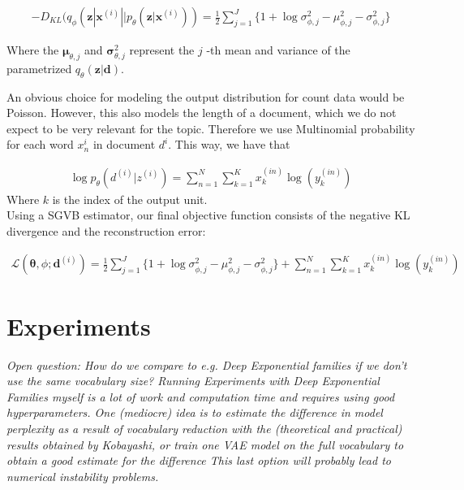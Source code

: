 \documentclass{report}
\begin{document}
	\begin{align}
	- D_{KL}(q_\phi (\mathbf{z}| \mathbf{x}^{(i)}||p_\theta (\mathbf{z}| \mathbf{x}^{(i)})) = \frac{1}{2}\sum\limits_{j=1}^{J}\{1+\log \sigma_{\phi ,j}^2 - \mu_{\phi,j}^2 - \sigma_{\phi ,j}^2\}
	\end{align}
	
	Where the $\mathbf{\mu}_{\theta,j}$ and $\mathbf{\sigma}_{\theta,j}^2$ represent the $j$ -th mean and variance of the parametrized $q_\theta(\mathbf{z}|\mathbf{d})$.
	
	An obvious choice for modeling the output distribution for count data would be Poisson. However, this also models the length of a document, which we do not expect to be very relevant for the topic. Therefore we use Multinomial probability for each word $x_n^{i}$ in document $d^{i}$. This way, we have that
	
	\begin{align}
	\log p_{\theta}(d^{(i)}|z^{(i)}) = 
	\sum_{n=1}^N
	\sum_{k=1}^K x_k^{(in)} \log (y_k^{(in)})
	\end{align}
	Where $k$ is the index of the output unit.\\
	
	
	Using a SGVB estimator, our final objective function consists of the negative KL divergence and the reconstruction error:
	
	\begin{align}
	\mathcal{L}(\mathbf{\theta}, \phi; \mathbf{d}^{(i)}) = \frac{1}{2}\sum\limits_{j=1}^{J}\{1+\log \sigma_{\phi ,j}^2 - \mu_{\phi,j}^2 - \sigma_{\phi ,j}^2\} 
	+ \sum_{n=1}^N
	\sum_{k=1}^K x_k^{(in)} \log (y_k^{(in)})
	\end{align}

\section{Experiments}
	\textit{Open question: How do we compare to e.g. Deep Exponential families if we don't use the same vocabulary size? Running Experiments with Deep Exponential Families myself is a lot of work and computation time and requires using good hyperparameters. One (mediocre) idea is to estimate the difference in model perplexity as a result of vocabulary reduction with the (theoretical and practical) results obtained by Kobayashi, or train one VAE model on the full vocabulary to obtain a good estimate for the difference This last option will probably lead to numerical instability problems.}
\end{document}
